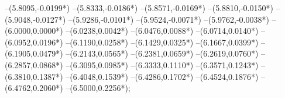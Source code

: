 {	--(5.8095,{-0.0199*\yskala})
	--(5.8333,{-0.0186*\yskala})
	--(5.8571,{-0.0169*\yskala})
	--(5.8810,{-0.0150*\yskala})
	--(5.9048,{-0.0127*\yskala})
	--(5.9286,{-0.0101*\yskala})
	--(5.9524,{-0.0071*\yskala})
	--(5.9762,{-0.0038*\yskala})
	--(6.0000,{0.0000*\yskala})
	--(6.0238,{0.0042*\yskala})
	--(6.0476,{0.0088*\yskala})
	--(6.0714,{0.0140*\yskala})
	--(6.0952,{0.0196*\yskala})
	--(6.1190,{0.0258*\yskala})
	--(6.1429,{0.0325*\yskala})
	--(6.1667,{0.0399*\yskala})
	--(6.1905,{0.0479*\yskala})
	--(6.2143,{0.0565*\yskala})
	--(6.2381,{0.0659*\yskala})
	--(6.2619,{0.0760*\yskala})
	--(6.2857,{0.0868*\yskala})
	--(6.3095,{0.0985*\yskala})
	--(6.3333,{0.1110*\yskala})
	--(6.3571,{0.1243*\yskala})
	--(6.3810,{0.1387*\yskala})
	--(6.4048,{0.1539*\yskala})
	--(6.4286,{0.1702*\yskala})
	--(6.4524,{0.1876*\yskala})
	--(6.4762,{0.2060*\yskala})
	--(6.5000,{0.2256*\yskala});
}
